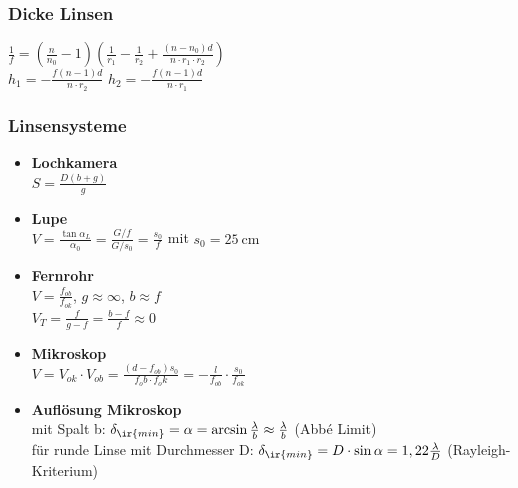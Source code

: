 \documentclass[german]{latex4ei/latex4ei_sheet}
\begin{document}
\begin{sectionbox}
\subsubsection{Dicke Linsen}
$\frac{1}{f}=(\frac{n}{n_0}-1)(\frac{1}{r_1}-\frac{1}{r_2}+\frac{(n-n_0)d}{n\cdot r_1 \cdot r_2})$\\
$h_1=-\frac{f(n-1)d}{n\cdot r_2}$ \qquad $h_2=-\frac{f(n-1)d}{n\cdot r_1}$
\subsubsection{Linsensysteme}
\begin{itemize}
	\item \textbf{Lochkamera} \\
		$S=\frac{D(b+g)}{g}$
	\item \textbf{Lupe} \\
		$V=\frac{\tan \alpha_L}{\alpha_0}=\frac{G/f}{G/s_0}=\frac{s_0}{f}$ mit $s_0=\SI{25}{\centi \meter}$
	\item \textbf{Fernrohr} \\
		$V=\frac{f_{ob}}{f_{ok}}$, $g\approx \infty$, $b\approx f$ \\
		$V_T=\frac{f}{g-f}=\frac{b-f}{f}\approx 0$
	\item \textbf{Mikroskop} \\
		$V=V_{ok}\cdot V_{ob}=\frac{(d-f_{ob})s_0}{f_ob \cdot f_ok}=-\frac{l}{f_{ob}}\cdot \frac{s_0}{f_{ok}}$
	\item \textbf{Auflösung Mikroskop} \\
	mit Spalt b: $\delta_{\ir{min}} = \alpha = \arcsin\frac{\lambda}{b} \approx \frac{\lambda}{b}$ (Abbé Limit)\\
	für runde Linse mit Durchmesser D: $\delta_{\ir{min}} = D\cdot\sin\alpha = 1,22\frac{\lambda}{D}$ (Rayleigh-Kriterium)\\
\end{itemize}
\end{sectionbox}
\end{document}
